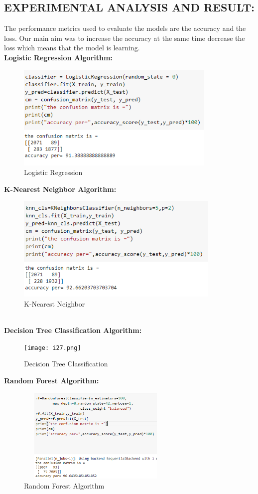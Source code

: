 \documentclass[12pt]{article}
\begin{document}
\subsection{EXPERIMENTAL ANALYSIS AND RESULT:}
The performance metrics used to evaluate the models are the accuracy and the loss.
Our main aim was to increase the accuracy at the same time decrease the loss which means 
that the model is learning. \\
\textbf{Logistic Regression Algorithm:}
 \begin{figure}[htbp]
    \centering
    \includegraphics[height=2in]{i25.png}
        \caption{Logistic Regression }
    \label{fig:galaxy}
\end{figure}
\newpage
\textbf{K-Nearest Neighbor Algorithm:}
 \begin{figure}[htbp]
    \centering
    \includegraphics[height=2in]{i26.png}
    \caption{K-Nearest Neighbor}
    \label{fig:galaxy}
\end{figure}
\\
\textbf{Decision Tree Classification Algorithm:}
 \begin{figure}[htbp]
    \centering
    \texttt{[image: i27.png]}
    \caption{Decision Tree Classification}
    \label{fig:galaxy}
\end{figure}
\newpage
\textbf{Random Forest Algorithm:}
 \begin{figure}[htbp]
    \centering
    \includegraphics[width=3in,height=1.8in]{i28.png}
    \caption{Random Forest Algorithm}
    \label{fig:galaxy}
\end{figure}
\end{document}
